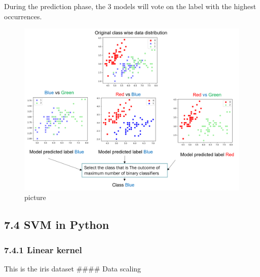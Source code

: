 \documentclass[
  letterpaper,
  DIV=11,
  numbers=noendperiod]{scrartcl}
\begin{document}
During the prediction phase, the 3 models will vote on the label with
the highest occurrences.

\begin{figure}[H]

{\centering \includegraphics{10.png}

}

\caption{picture}

\end{figure}%

\subsection{7.4 SVM in Python}\label{svm-in-python}

\subsubsection{7.4.1 Linear kernel}\label{linear-kernel}

This is the iris dataset \#\#\#\# Data scaling
\end{document}
